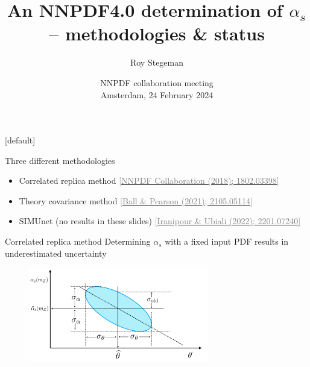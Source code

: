 \documentclass[aspectratio=169, 8pt,t]{beamer}
\title{An NNPDF4.0 determination of $\alpha_s$ -- methodologies \& status}
\date{NNPDF collaboration meeting  \\[0.1cm] Amsterdam, 24 February 2024}
\author{Roy Stegeman}
\institute{\small The University of Edinburgh}
\begin{document}
{
\begin{frame}
  \titlepage
\end{frame}
}

[default]





\begin{frame}{Three different methodologies}
  \begin{itemize}
    \item Correlated replica method \href{https://arxiv.org/abs/1802.03398}{\textcolor{gray}{[NNPDF Collaboration (2018); 1802.03398]}}
    \item Theory covariance method \href{https://arxiv.org/abs/2105.05114}{\textcolor{gray}{[Ball \& Pearson (2021); 2105.05114]}}
    \item SIMUnet (no results in these slides) \href{https://arxiv.org/abs/2201.07240}{\textcolor{gray}{[Iranipour \& Ubiali (2022); 2201.07240]}}
  \end{itemize}
\end{frame}


\begin{frame}{Correlated replica method}
  Determining $\alpha_s$ with a fixed input PDF results in underestimated uncertainty
  \begin{figure}
    \centering
    \includegraphics[width=0.7\textwidth]{figures/alphaspdfcorplot.png}
  \end{figure}
\end{frame}
\end{document}
